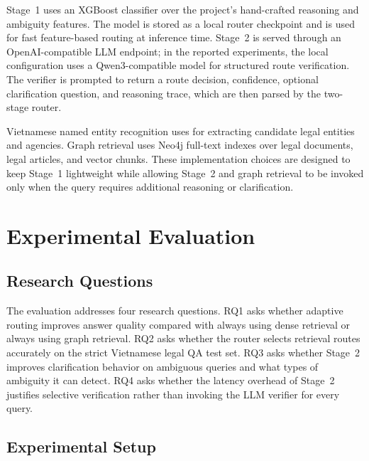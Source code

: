 \documentclass[11pt,twocolumn]{article}
\begin{document}
Stage~1 uses an XGBoost classifier over the project's
hand-crafted reasoning and ambiguity features. The model is
stored as a local router checkpoint and is used for fast
feature-based routing at inference time. Stage~2 is served
through an OpenAI-compatible LLM endpoint; in the reported
experiments, the local configuration uses a Qwen3-compatible
model for structured route verification. The verifier is
prompted to return a route decision, confidence, optional
clarification question, and reasoning trace, which are then
parsed by the two-stage router.

Vietnamese named entity recognition uses
 for extracting
candidate legal entities and agencies. Graph retrieval uses
Neo4j full-text indexes over legal documents, legal articles,
and vector chunks. These implementation choices are designed
to keep Stage~1 lightweight while allowing Stage~2 and graph
retrieval to be invoked only when the query requires
additional reasoning or clarification.

\FloatBarrier

\section{Experimental Evaluation}
\label{sec:eval}

\subsection{Research Questions}
\label{subsec:research_questions}

The evaluation addresses four research questions. RQ1 asks
whether adaptive routing improves answer quality compared
with always using dense retrieval or always using graph
retrieval. RQ2 asks whether the router selects retrieval
routes accurately on the strict Vietnamese legal QA test set.
RQ3 asks whether Stage~2 improves clarification behavior on
ambiguous queries and what types of ambiguity it can detect.
RQ4 asks whether the latency overhead of Stage~2 justifies
selective verification rather than invoking the LLM verifier
for every query.

\subsection{Experimental Setup}
\label{subsec:experimental_setup}
\end{document}
